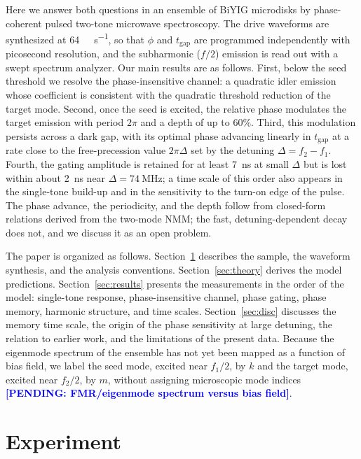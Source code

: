 \documentclass[aps,prb,reprint,superscriptaddress,floatfix]{revtex4-2}
\newcommand{\pend}[1]{\textcolor{blue}{\textbf{[PENDING: #1]}}}
\newcommand{\pend}[1]{}
\newcommand{\tgap}{t_{\mathrm{gap}}}
\begin{document}
Here we answer both questions in an ensemble of BiYIG microdisks by phase-coherent pulsed two-tone microwave spectroscopy. The drive waveforms are synthesized at \SI{64}{\giga\sample\per\second}, so that $\phi$ and $\tgap$ are programmed independently with picosecond resolution, and the subharmonic ($f/2$) emission is read out with a swept spectrum analyzer. Our main results are as follows. First, below the seed threshold we resolve the phase-insensitive channel: a quadratic idler emission whose coefficient is consistent with the quadratic threshold reduction of the target mode. Second, once the seed is excited, the relative phase modulates the target emission with period $2\pi$ and a depth of up to 60\%. Third, this modulation persists across a dark gap, with its optimal phase advancing linearly in $\tgap$ at a rate close to the free-precession value $2\pi\Delta$ set by the detuning $\Delta=f_2-f_1$. Fourth, the gating amplitude is retained for at least \SI{7}{\nano\second} at small $\Delta$ but is lost within about \SI{2}{\nano\second} near $\Delta=\SI{74}{\mega\hertz}$; a time scale of this order also appears in the single-tone build-up and in the sensitivity to the turn-on edge of the pulse. The phase advance, the periodicity, and the depth follow from closed-form relations derived from the two-mode NMM; the fast, detuning-dependent decay does not, and we discuss it as an open problem.

The paper is organized as follows. Section~\ref{sec:exp} describes the sample, the waveform synthesis, and the analysis conventions. Section~\ref{sec:theory} derives the model predictions. Section~\ref{sec:results} presents the measurements in the order of the model: single-tone response, phase-insensitive channel, phase gating, phase memory, harmonic structure, and time scales. Section~\ref{sec:disc} discusses the memory time scale, the origin of the phase sensitivity at large detuning, the relation to earlier work, and the limitations of the present data. Because the eigenmode spectrum of the ensemble has not yet been mapped as a function of bias field, we label the seed mode, excited near $f_1/2$, by $k$ and the target mode, excited near $f_2/2$, by $m$, without assigning microscopic mode indices \pend{FMR/eigenmode spectrum versus bias field}.

\section{Experiment}\label{sec:exp}
\end{document}
